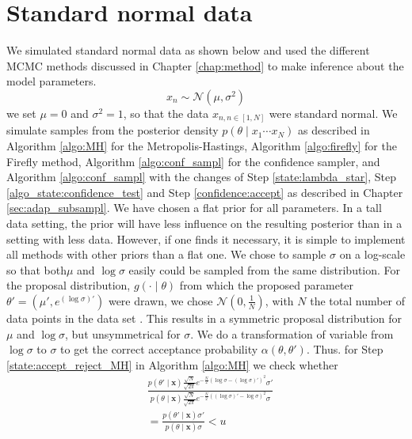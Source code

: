 \section{Standard normal data}
We simulated standard normal data as shown below and used the different MCMC methods discussed in Chapter \ref{chap:method} to make inference about the model parameters.
\begin{equation*}
    x_n \sim \mathcal{N}\left(\mu,\sigma^2\right)
\end{equation*}
we set $\mu = 0$ and $\sigma^2 = 1$, so that the data $x_{n, n\in \left[1, N\right]}$ were standard normal. 
We simulate samples from the posterior density $p\left(\theta\mid x_1 \cdots x_N\right)$ as described in Algorithm \ref{algo:MH} for the Metropolis-Hastings, Algorithm \ref{algo:firefly} for the Firefly method, Algorithm \ref{algo:conf_sampl} for the confidence sampler, and Algorithm \ref{algo:conf_sampl} with the changes of Step \ref{state:lambda_star}, Step \ref{algo_state:confidence_test} and Step \ref{confidence:accept} as described in Chapter \ref{sec:adap_subsampl}. We have chosen a flat prior for all parameters. In a tall data setting, the prior will have less influence on the resulting posterior than in a setting with less data. However, if one finds it necessary, it is simple to implement all methods with other priors than a flat one. 
We chose to sample $\sigma$ on a log-scale so that both$\mu$ and $\log\sigma$ easily could be sampled from the same distribution.
For the proposal distribution, $g\left(\cdot\mid\theta\right)$ from which the proposed parameter $\theta' = \left(\mu', e^{\left(\log \sigma\right)'}\right)$ were drawn, we chose $\mathcal{N}\left(0, \frac{1}{N}\right)$, with $N$ the total number of data points in the data set . This results in a symmetric proposal distribution for $\mu$ and $\log \sigma$, but unsymmetrical for $\sigma$. We do a transformation of variable from $\log \sigma$ to $\sigma$ to get the correct acceptance probability $\alpha \left(\theta, \theta'\right)$. Thus. for Step \ref{state:accept_reject_MH} in Algorithm \ref{algo:MH} we check whether 
\begin{equation*}
\begin{split}
    &\frac{p\left(\theta' \mid \mathbf{x}\right) \frac{\sqrt{N}}{\sqrt{2\pi}}e^{-\frac{N}{2}\left(\log \sigma -\left(\log\sigma\right)'  \right)^2}\sigma'}{p\left(\theta \mid \mathbf{x}\right) \frac{\sqrt{N}}{\sqrt{2\pi}}e^{-\frac{N}{2}\left( \left(\log\sigma\right)' - \log \sigma \right)^2}\sigma} \\
    &= \frac{p\left(\theta'\mid \mathbf{x}\right) \sigma'}{p\left(\theta\mid \mathbf{x}\right) \sigma} < u
    \end{split}
\end{equation*}
